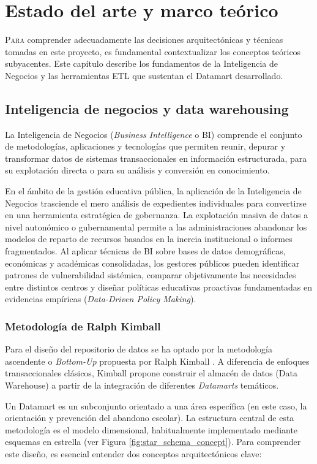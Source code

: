 \chapter{Estado del arte y marco teórico}
\label{chap:estado_arte}

\lettrine{P}{ara} comprender adecuadamente las decisiones arquitectónicas y técnicas tomadas en este proyecto, es fundamental contextualizar los conceptos teóricos subyacentes. Este capítulo describe los fundamentos de la Inteligencia de Negocios y las herramientas ETL que sustentan el Datamart desarrollado.

\section{Inteligencia de negocios y data warehousing}
La Inteligencia de Negocios (\textit{Business Intelligence} o BI) comprende el conjunto de metodologías, aplicaciones y tecnologías que permiten reunir, depurar y transformar datos de sistemas transaccionales en información estructurada, para su explotación directa o para su análisis y conversión en conocimiento.

En el ámbito de la gestión educativa pública, la aplicación de la Inteligencia de Negocios trasciende el mero análisis de expedientes individuales para convertirse en una herramienta estratégica de gobernanza. La explotación masiva de datos a nivel autonómico o gubernamental permite a las administraciones abandonar los modelos de reparto de recursos basados en la inercia institucional o informes fragmentados. Al aplicar técnicas de BI sobre bases de datos demográficas, económicas y académicas consolidadas, los gestores públicos pueden identificar patrones de vulnerabilidad sistémica, comparar objetivamente las necesidades entre distintos centros y diseñar políticas educativas proactivas fundamentadas en evidencias empíricas (\textit{Data-Driven Policy Making}).

\subsection{Metodología de Ralph Kimball}
Para el diseño del repositorio de datos se ha optado por la metodología ascendente o \textit{Bottom-Up} propuesta por Ralph Kimball \cite{Kimball_DWH}. A diferencia de enfoques transaccionales clásicos, Kimball propone construir el almacén de datos (Data Warehouse) a partir de la integración de diferentes \textit{Datamarts} temáticos.

Un Datamart es un subconjunto orientado a una área específica (en este caso, la orientación y prevención del abandono escolar). La estructura central de esta metodología es el modelo dimensional, habitualmente implementado mediante esquemas en estrella (ver Figura \ref{fig:star_schema_concept}). Para comprender este diseño, es esencial entender dos conceptos arquitectónicos clave:

